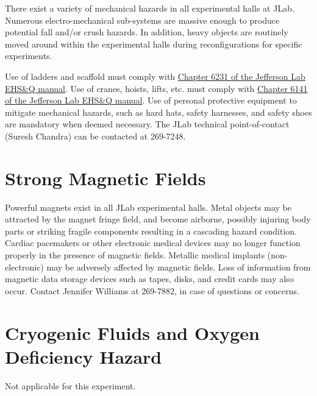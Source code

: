 	There exist a variety of mechanical hazards in all experimental halls at JLab. 
Numerous electro-mechanical sub-systems are massive enough to produce potential fall 
and/or crush hazards.  In addition, heavy objects are routinely moved around within 
the experimental halls during reconfigurations for specific experiments. 

Use of ladders and scaffold must comply 
with \href{http://www.jlab.org/ehs/ehsmanual/manual/6132.html}{Chapter 6231 of the 
Jefferson Lab EHS\&Q manual}.
Use of cranes, hoists, lifts, etc. must comply with
\href{http://www.jlab.org/ehs/ehsmanual/manual/6141.html}{Chapter 6141 of the 
Jefferson Lab EHS\&Q manual}. 
Use of personal protective equipment 
to mitigate mechanical hazards, such as hard hats, safety harnesses, and safety 
shoes are mandatory when deemed necessary.
The JLab technical point-of-contact (Suresh Chandra) can be contacted at 269-7248.

\section{Strong Magnetic Fields}


	Powerful magnets exist in all JLab experimental halls. Metal objects may be attracted 
by the magnet fringe field, and become airborne, possibly injuring body parts or striking 
fragile components resulting in a cascading hazard condition. Cardiac pacemakers or other 
electronic medical devices may no longer function properly in the presence of magnetic fields. 
Metallic medical implants (non-electronic) may be adversely affected by magnetic fields. Loss of 
information from magnetic data storage devices such as tapes, disks, and credit cards may also occur. 
Contact Jennifer Williams at 269-7882, in case of questions or concerns.

\section{Cryogenic Fluids and Oxygen Deficiency Hazard}

Not applicable for this experiment.

